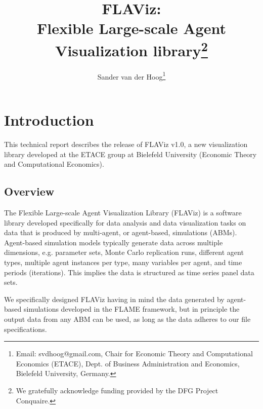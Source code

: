 \documentclass[10pt,a4paper]{article}
\begin{document}
\makeatletter

\renewcommand*{\@fnsymbol}[1]{\ensuremath{\ifcase#1\or \star\or a\or b\or
   \mathsection\or \mathparagraph\or \|\or \star\star\or \dagger\dagger
   \or \ddagger\ddagger \else\@ctrerr\fi}}

\makeatother

\title{FLAViz:\\Flexible Large-scale Agent Visualization library\thanks{We gratefully acknowledge funding provided by the DFG Project Conquaire.}}

\author{Sander van der Hoog\thanks{Email: svdhoog@gmail.com, Chair for Economic Theory and Computational Economics (ETACE), Dept. of Business Administration and Economics, Bielefeld University, Germany.}}

\maketitle


\clearpage
\tableofcontents

\clearpage
\section{Introduction}
This technical report describes the release of FLAViz v1.0, a new visualization library developed at the ETACE group at Bielefeld University (Economic Theory and Computational Economics). 

\subsection{Overview}

The Flexible Large-scale Agent Visualization Library (FLAViz) is a software library developed specifically for data analysis and data visualization tasks on data that is produced by multi-agent, or agent-based, simulations (ABMs). Agent-based simulation models typically generate data across multiple dimensions, e.g. parameter sets, Monte Carlo replication runs, different agent types, multiple agent instances per type, many variables per agent, and time periods (iterations). This implies the data is structured as time series panel data sets.

We specifically designed FLAViz having in mind the data generated by agent-based simulations developed in the FLAME framework, but in principle the output data from any ABM can be used, as long as the data adheres to our file specifications.
\end{document}
